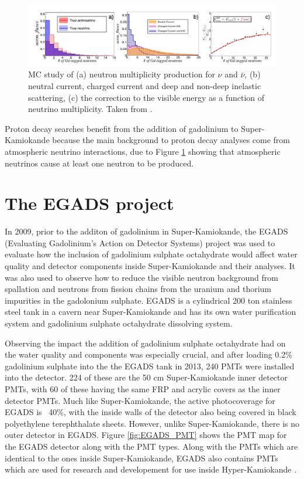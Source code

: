 \begin{figure}[H]
    \includegraphics[width=\textwidth]{Figures/atm_recon_energy.png}
\caption{MC study of (a) neutron multiplicity production for $\nu$ and ${\bar{\nu}}$, (b) neutral current, charged current and deep and non-deep inelastic scattering, (c) the correction to the visible energy as a function of neutrino multiplicity. Taken from \cite{martiEvaluationGadoliniumAction2020}.}
\label{fig:atm_nu_energy}
\end{figure}


Proton decay searches benefit from the addition of gadolinium to Super-Kamiokande because the main background to proton decay analyses come from atmospheric neutrino interactions, due to Figure \ref{fig:atm_nu_energy} showing that atmospheric neutrinos cause at least one neutron to be produced. 

\section{The EGADS project}

In 2009, prior to the additon of gadolinium in Super-Kamiokande, the EGADS (Evaluating Gadolinium's Action on Detector Systems) project was used to evaluate how the inclusion of gadolinium sulphate octahydrate would affect water quality and detector components inside Super-Kamiokande and their analyses. It was also used to observe how to reduce the visible neutron background from spallation and neutrons from fission chains from the uranium and thorium impurities in the gadolonium sulphate. EGADS is a cylindrical 200 ton stainless steel tank in a cavern near Super-Kamiokande and has its own water purification system and gadolinium sulphate octahydrate dissolving system. 

Observing the impact the addition of gadolinium sulphate octahydrate had on the water quality and components was especially crucial, and after loading 0.2\% gadolinium sulphate into the the EGADS tank in 2013, 240 PMTs were installed into the detector. 224 of these are the 50 cm Super-Kamiokande inner detector PMTs, with 60 of these having the same FRP and acrylic covers as the inner detector PMTs. Much like Super-Kamiokande, the active photocoverage for EGADS is ~40\%, with the inside walls of the detector also being covered in black polyethylene terephthalate sheets. However, unlike Super-Kamiokande, there is no outer detector in EGADS. Figure \ref{fig:EGADS_PMT} shows the PMT map for the EGADS detector along with the PMT types. Along with the PMTs which are identical to the ones inside Super-Kamiokande, EGADS also contains PMTs which are used for research and developement for use inside Hyper-Kamiokande \cite{martiEvaluationGadoliniumAction2020a}.

